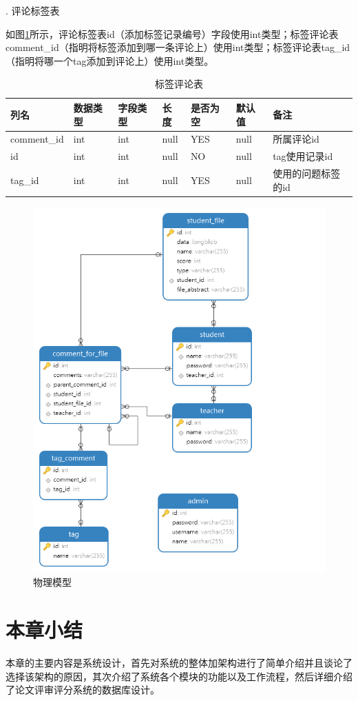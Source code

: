 .  评论标签表

如图\ref{db-tag-comment}所示，评论标签表id（添加标签记录编号）字段使用int类型；标签评论表comment\_id（指明将标签添加到哪一条评论上）使用int类型；标签评论表tag\_id（指明将哪一个tag添加到评论上）使用int类型。
\begin{table}[]
    \centering
    \song\wuhao
    \caption{标签评论表}
    \label{db-tag-comment}
    \begin{tabular}{lllllll}
        \hline
        列名        & 数据类型 & 字段类型 & 长度 & 是否为空 & 默认值 & 备注               \\ \hline
        comment\_id & int      & int      & null & YES      & null   & 所属评论id         \\
        id          & int      & int      & null & NO       & null   & tag使用记录id      \\
        tag\_id     & int      & int      & null & YES      & null   & 使用的问题标签的id \\ \hline
    \end{tabular}
\end{table}

\begin{figure}[htbp]
    \centering
    \includegraphics[scale = 0.6]{out/uml/数据库/physical-model.png}
    \caption{\song\wuhao 物理模型}
    \label{physical-model}
\end{figure}

\section{本章小结}

本章的主要内容是系统设计，首先对系统的整体加架构进行了简单介绍并且谈论了选择该架构的原因，其次介绍了系统各个模块的功能以及工作流程，然后详细介绍了论文评审评分系统的数据库设计。

